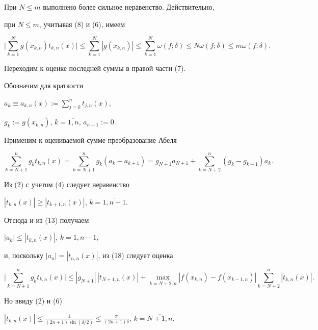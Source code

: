 При $N\le m$ выполнено более сильное неравенство. Действительно,


при $N\le m$, учитывая (8) и (6), имеем


$$


\bigg|\sum_{k=1}^Ng(x_{k,n})t_{k,n}(x)\bigg|\le\sum_{k=1}^N


|g(x_{k,n})|\le\sum_{k=1}^N\omega(f;\delta)\le N\omega(f;


\delta)\le m\omega(f;\delta).


$$





Переходим к оценке последней суммы в правой части (7).


Обозначим для краткости


$a_k\equiv a_{k,n}(x):=\sum\limits_{j=k}^nt_{j,n}(x)$,


$g_k:=g(x_{k,n})$, $k=\overline{1,n}$, $a_{n+1}:=0$.


Применим к оцениваемой сумме преобразование Абеля


\begin{equation}


\sum_{k=N+1}^ng_kt_{k,n}(x)=\sum_{k=N+1}^ng_k(a_k-a_{k+1})=


g_{N+1}a_{N+1}+\sum_{k=N+2}^n(g_k-g_{k-1})a_k.


\end{equation}





Из (2) с учетом (4) следует неравенство


$|t_{k,n}(x)|\ge|t_{k+1,n}(x)|$, $k=\overline{1,n-1}$.


Отсюда и из (13) получаем


$|a_k|\le|t_{k,n}(x)|$, $k=\overline{1,n-1}$,


и, поскольку $|a_n|=|t_{n,n}(x)|$, из (18) следует оценка


$$


\bigg|\sum_{k=N+1}^ng_kt_{k,n}(x)\bigg|\le|g_{N+1}|\,


|t_{N+1,n}(x)|+


\max_{k=\overline{N+2,n}}|f(x_{k,n})-f(x_{k-1,n})|


\sum_{k=N+2}^n|t_{k,n}(x)|.


$$


Но ввиду (2) и (6)


$|t_{k,n}(x)|\le\frac1{(2n+1)\sin(\delta/2)}\le\frac{\pi}


{(2n+1)\delta}$, $k=\overline{N+1,n}$.


